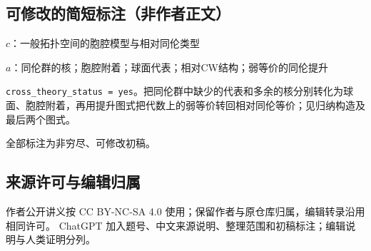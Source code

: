 \documentclass[UTF8,11pt]{ctexart}
\theoremstyle{definition}
\begin{document}
\subsection*{可修改的简短标注（非作者正文）}
$c$：一般拓扑空间的胞腔模型与相对同伦类型

$a$：同伦群的核；胞腔附着；球面代表；相对CW结构；弱等价的同伦提升

\texttt{cross\_theory\_status = yes}。把同伦群中缺少的代表和多余的核分别转化为球面、胞腔附着，再用提升图式把代数上的弱等价转回相对同伦等价；见归纳构造及最后两个图式。

全部标注为非穷尽、可修改初稿。
\subsection*{来源许可与编辑归属}
作者公开讲义按 CC BY-NC-SA 4.0 使用；保留作者与原仓库归属，编辑转录沿用相同许可。
ChatGPT 加入题号、中文来源说明、整理范围和初稿标注；编辑说明与人类证明分列。
\end{document}
